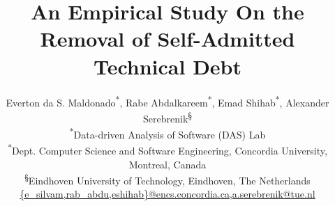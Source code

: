 \documentclass[10pt, conference]{IEEEtran}
\begin{document}
	
\title{An Empirical Study On the Removal of Self-Admitted Technical Debt}
\author{
	Everton da S. Maldonado\textsuperscript{*}, Rabe Abdalkareem\textsuperscript{*}, Emad Shihab\textsuperscript{*}, Alexander Serebrenik\textsuperscript{\S}\\
\textsuperscript{*}Data-driven Analysis of Software (DAS) Lab\\
\textsuperscript{*}Dept. Computer Science and Software Engineering, Concordia University, Montreal, Canada\\
\textsuperscript{\S}Eindhoven University of Technology, Eindhoven, The Netherlands\\
\url{{e_silvam,rab_abdu,eshihab}@encs.concordia.ca},\url{a.serebrenik@tue.nl}
}

\end{document}

